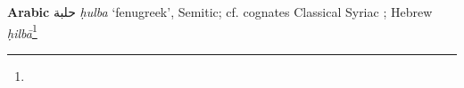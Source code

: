 \begin{etymology}\label{ety:hulba}
\textbf{Arabic} {حلبة} \textit{ḥulba} `fenugreek', Semitic; cf. cognates Classical Syriac ; Hebrew  \textit{ḥilbā}\footnote{}
\end{etymology}